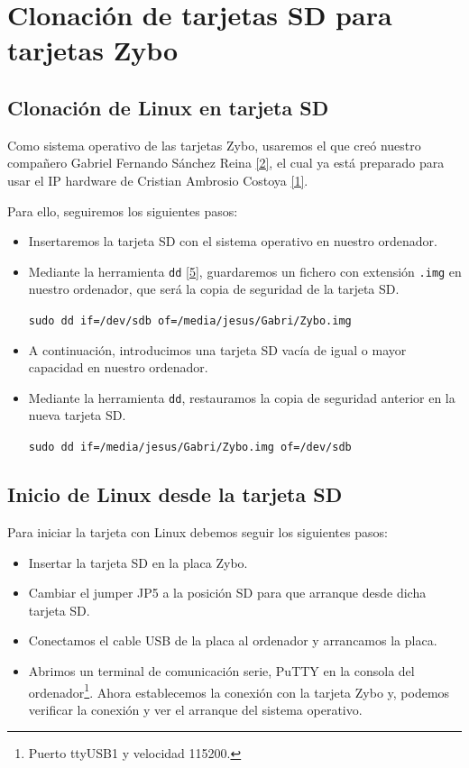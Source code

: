\section{Clonación de tarjetas SD para tarjetas Zybo}
\hypertarget{InstalacionLinux}{}
\subsection{Clonación de Linux en tarjeta SD}
Como sistema operativo de las tarjetas Zybo, usaremos el que creó nuestro compañero Gabriel Fernando Sánchez Reina \hyperlink{2}{[2]}, el cual ya está preparado para usar el IP hardware de Cristian Ambrosio Costoya \hyperlink{1}{[1]}.

Para ello, seguiremos los siguientes pasos:
\begin{itemize}
	\item Insertaremos la tarjeta SD con el sistema operativo en nuestro ordenador.
	\item Mediante la herramienta \texttt{dd} \hyperlink{5}{[5]}, guardaremos un fichero con extensión \texttt{.img} en nuestro ordenador, que será la copia de seguridad de la tarjeta SD.
	\begin{center}
		\texttt{sudo dd if=/dev/sdb of=/media/jesus/Gabri/Zybo.img}
	\end{center}
	\item A continuación, introducimos una tarjeta SD vacía de igual o mayor capacidad en nuestro ordenador.
	\item Mediante la herramienta \texttt{dd}, restauramos la copia de seguridad anterior en la nueva tarjeta SD.
	\begin{center}
		\texttt{sudo dd if=/media/jesus/Gabri/Zybo.img of=/dev/sdb}
	\end{center}
\end{itemize}

\subsection{Inicio de Linux desde la tarjeta SD}
Para iniciar la tarjeta con Linux debemos seguir los siguientes pasos:
\begin{itemize}
	\item Insertar la tarjeta SD en la placa Zybo.
	\item Cambiar el jumper JP5 a la posición SD para que arranque desde dicha tarjeta SD.
	\item Conectamos el cable USB de la placa al ordenador y arrancamos la placa.
	\item Abrimos un terminal de comunicación serie, PuTTY en la consola del ordenador\footnote{Puerto ttyUSB1 y velocidad 115200.}. Ahora establecemos la conexión con la tarjeta Zybo y, podemos verificar la conexión y ver el arranque del sistema operativo.
\end{itemize}

